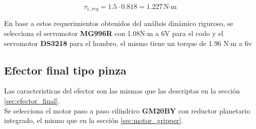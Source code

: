 \begin{equation}
\tau_{1,req} = 1.5 \cdot 0.818 = 1.227 \, \text{N·m}
\end{equation}




En base a estos requerimientos obtenidos del análisis dinámico riguroso, se selecciona el servomotor \textbf{MG996R} con 1.08N$\cdot$m a 6V para el codo y el servomotor \textbf{DS3218} para el hombro, el mismo tiene un torque de 1.96 N$\cdot$m a 6v

\subsection{Efector final tipo pinza}

Las caracteristicas del efector son las mismas que las descriptas en la sección \ref{sec:efector_final}.\\

Se selecciona el motor paso a paso cilíndrico \textbf{GM20BY} con reductor planetario integrado, el mismo que en la sección \ref{sec:motor_gripper}.